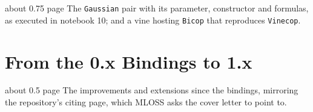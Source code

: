 \documentclass[twoside,11pt]{article}
\begin{document}
\begin{plan}{about 0.75 page}
The \texttt{Gaussian} pair with its parameter, constructor and formulas, as
executed in notebook 10; and a vine hosting \texttt{Bicop} that reproduces
\texttt{Vinecop}.
\end{plan}

\section{From the 0.x Bindings to 1.x}
\label{app:changes}

\begin{plan}{about 0.5 page}
The improvements and extensions since the bindings, mirroring the
repository's citing page, which MLOSS asks the cover letter to point to.
\end{plan}

\vskip 0.2in

\end{document}
